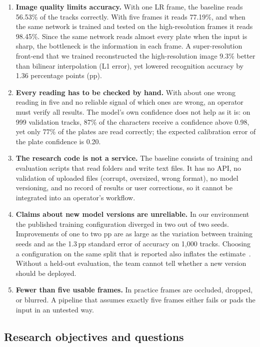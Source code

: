 \documentclass[11pt,a4paper]{article}
\newcommand{\pp}{\,pp}
\begin{document}
\begin{enumerate}[label=\textbf{P\arabic*}]
\item \textbf{Image quality limits accuracy.} With one LR frame, the baseline reads 56.53\% of the tracks correctly. With five frames it reads 77.19\%, and when the same network is trained and tested on the high-resolution frames it reads 98.45\%. Since the same network reads almost every plate when the input is sharp, the bottleneck is the information in each frame. A super-resolution front-end that we trained reconstructed the high-resolution image 9.3\% better than bilinear interpolation (L1 error), yet lowered recognition accuracy by 1.36 percentage points (pp).
\item \textbf{Every reading has to be checked by hand.} With about one wrong reading in five and no reliable signal of which ones are wrong, an operator must verify all results. The model's own confidence does not help as it is: on 999 validation tracks, 87\% of the characters receive a confidence above 0.98, yet only 77\% of the plates are read correctly; the expected calibration error of the plate confidence is 0.20.
\item \textbf{The research code is not a service.} The baseline consists of training and evaluation scripts that read folders and write text files. It has no API, no validation of uploaded files (corrupt, oversized, wrong format), no model versioning, and no record of results or user corrections, so it cannot be integrated into an operator's workflow.
\item \textbf{Claims about new model versions are unreliable.} In our environment the published training configuration diverged in two out of two seeds. Improvements of one to two pp are as large as the variation between training seeds and as the 1.3\pp{} standard error of accuracy on 1{,}000 tracks. Choosing a configuration on the same split that is reported also inflates the estimate~\cite{recht2019imagenet}. Without a held-out evaluation, the team cannot tell whether a new version should be deployed.
\item \textbf{Fewer than five usable frames.} In practice frames are occluded, dropped, or blurred. A pipeline that assumes exactly five frames either fails or pads the input in an untested way.
\end{enumerate}

\subsection{Research objectives and questions}
\end{document}
